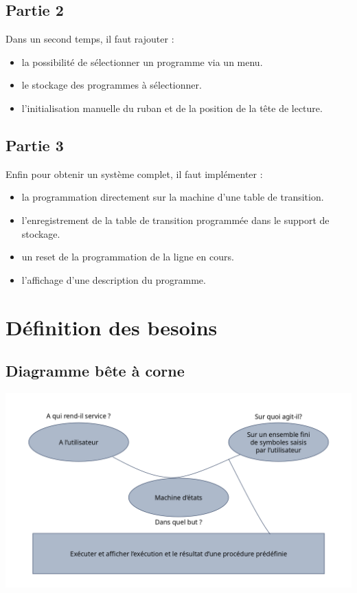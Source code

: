 \documentclass[12pt]{report}
\begin{document}
	 \subsection{Partie 2}
	 Dans un second temps, il faut rajouter :
	 \begin{itemize}[label=$-$]
	 	\item  la possibilité de sélectionner un programme via un menu.
	 	\item le stockage des programmes à sélectionner.
	 	\item l'initialisation manuelle du ruban et de la position de la tête de lecture.
	 \end{itemize}
	 \subsection{Partie 3}
	 Enfin pour obtenir un système complet, il faut implémenter :
	 \begin{itemize}[label=$-$]
	 	\item la programmation directement sur la machine d'une table de transition.
	 	\item l'enregistrement de la table de transition programmée dans le support de stockage.
	 	\item un reset de la programmation de la ligne en cours.
	 	\item l'affichage d'une description du programme.
	 \end{itemize}
 	\section{Définition des besoins}
 	 \subsection{Diagramme bête à corne}
 	 \includegraphics[width=\textwidth]{img/bete_a_corne}
\end{document}
